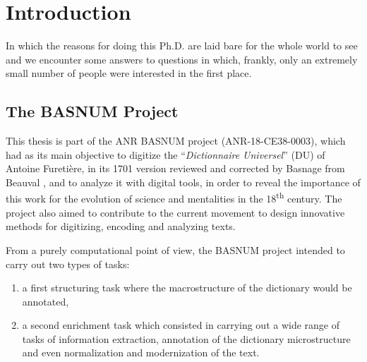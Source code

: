 \chapter{Introduction}

\begin{center}
    \begin{minipage}{0.66\textwidth}
        \begin{small}
            In which the reasons for doing this Ph.D. are laid bare for the whole world to see and we encounter some answers to questions in which, frankly, only an extremely small number of people were interested in the first place.
        \end{small}
    \end{minipage}
    \vspace{0.5cm}
\end{center}

\section{The BASNUM Project}

This thesis is part of the ANR BASNUM project (ANR-18-CE38-0003), which had as its main objective to digitize the \enquote{\emph{Dictionnaire Universel}} (DU) of Antoine Furetière, in its 1701 version reviewed and corrected by Basnage from Beauval \citep{furetiere-1701-dictionnaire}, and to analyze it with digital tools, in order to reveal the importance of this work for the evolution of science and mentalities in the 18\textsuperscript{th} century. The project also aimed to contribute to the current movement to design innovative methods for digitizing, encoding and analyzing texts.

From a purely computational point of view, the BASNUM project intended to carry out two types of tasks:
\begin{enumerate}
    \item a first structuring task where the macrostructure of the dictionary would be annotated,
    \item a second enrichment task which consisted in carrying out a wide range of tasks of information extraction, annotation of the dictionary microstructure and even normalization and modernization of the text.
\end{enumerate}


